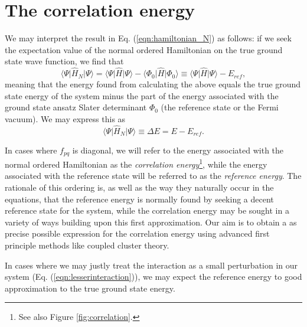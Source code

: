 \section{The correlation energy}

We may interpret the result in Eq. (\ref{eqn:hamiltonian_N}) as follows: if
we seek the expectation value of the normal ordered Hamiltonian on the
true ground state wave function, we find that
\begin{equation}
\langle \Psi \vert \hat{H}_N  \vert \Psi \rangle = 
\langle \Psi \vert \hat{H}  \vert \Psi \rangle -
\langle \Phi_0 \vert \hat{H} \vert \Phi_0 \rangle \equiv
\langle \Psi \vert \hat{H}  \vert \Psi \rangle -
E_{ref},
\label{eqn:hamiltonian_N_vacuum}
\end{equation}
meaning that the energy found from calculating the above equals the
true ground state energy of the system minus the part of the energy associated
with the ground state ansatz Slater determinant $\Phi_0$ (the reference state or the Fermi vacuum). We may express this as
\begin{equation}
\langle \Psi \vert \hat{H}_N  \vert \Psi \rangle \equiv \Delta E = E - E_{ref}.
\label{eqn:correlation_energy}
\end{equation}

In cases where $f_{pq}$ is diagonal, we will refer to the energy
associated with the normal ordered Hamiltonian as the
\emph{correlation energy}\footnote{See also Figure
  \ref{fig:correlation}.}, while the energy associated with the reference
state will be referred to as the \emph{reference energy}. The
rationale of this ordering is, as well as the way they naturally occur
in the equations, that the reference energy is normally found by
seeking a decent reference state for the system, while the correlation
energy may be sought in a variety of ways building upon this first
approximation. Our aim is to obtain a as precise possible expression
for the correlation energy using advanced first principle methods like
coupled cluster theory.

In cases where we may justly treat the interaction as a small perturbation in our system (Eq. (\ref{eqn:lesserinteraction})), we may expect the reference
energy to good approximation to the true ground state energy.

